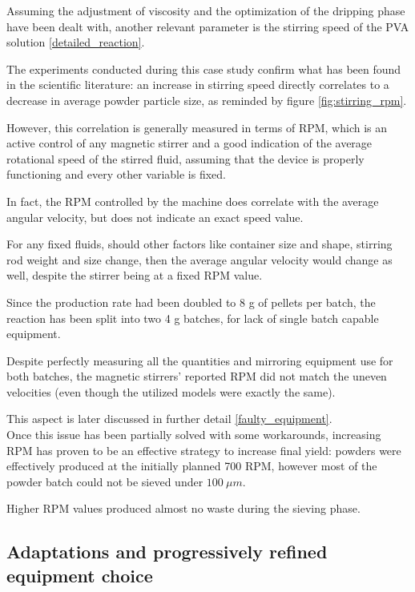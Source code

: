 \documentclass{article}
\begin{document}
        Assuming the adjustment of viscosity and the optimization of the dripping phase have been dealt with, 
        another relevant parameter is the stirring speed of the PVA solution \ref{detailed_reaction}. 

        The experiments conducted during this case study confirm what has been found in the scientific literature: 
        an increase in stirring speed directly correlates to a decrease in average powder particle size, as reminded by figure \ref{fig:stirring_rpm}. 

        However, this correlation is generally measured in terms of RPM, which is an active control of any magnetic stirrer and 
        a good indication of the average rotational speed of the stirred fluid, assuming that the device is properly functioning
        and every other variable is fixed. 
        
        In fact, the RPM controlled by the machine does correlate with the average angular velocity, but does not indicate 
        an exact speed value. 

        For any fixed fluids, should other factors like container size and shape, stirring rod weight and size change, 
        then the average angular velocity would change as well, despite the stirrer being at a fixed RPM value. 

        Since the production rate had been doubled to 8 g of pellets per batch, the reaction has been split into two 
        4 g batches, for lack of single batch capable equipment. 

        Despite perfectly measuring all the quantities and mirroring equipment use for both batches, the magnetic stirrers'
        reported RPM did not match the uneven velocities (even though the utilized models were exactly the same). 

        This aspect is later discussed in further detail \ref{faulty_equipment}. \\ 

        Once this issue has been partially solved with some workarounds, increasing RPM has proven to be an effective 
        strategy to increase final yield: powders were effectively produced at the initially planned 700 RPM, however 
        most of the powder batch could not be sieved under $100 \ \mu m$. 

        Higher RPM values produced almost no waste during the sieving phase. 


        \subsection{Adaptations and progressively refined equipment choice\label{faulty_equipment}}
\end{document}
